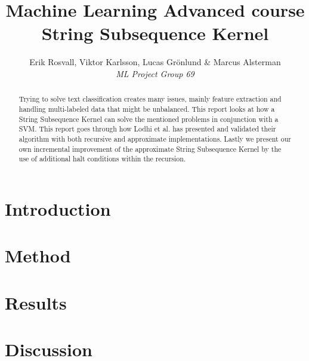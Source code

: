 \documentclass[10pt,a4paper]{article}
\author{Erik Rosvall, Viktor Karlsson, Lucas Grönlund \& Marcus Alsterman \\ \textit{ML Project Group 69}}
\title{Machine Learning Advanced course \\ String Subsequence Kernel}
\begin{document}
	\begin{titlingpage}
		\maketitle
		\begin{abstract}
			\noindent
			\begin{addmargin}[4em]{4em}
			Trying to solve text classification creates many issues, mainly feature extraction and handling multi-labeled data that might be unbalanced. This report looks at how a String Subsequence Kernel can solve the mentioned problems in conjunction with a SVM. This report goes through how Lodhi et al. has presented and validated their algorithm with both recursive and approximate implementations. Lastly we present our own incremental improvement of the approximate String Subsequence Kernel by the use of additional halt conditions within the recursion. 			
	\end{addmargin}
		\end{abstract}
	\end{titlingpage}
	
	\section{Introduction}
	
	
	\section{Method}
	

	\section{Results}
	
	
	\section{Discussion}
	
	
	
	
	
\end{document}
